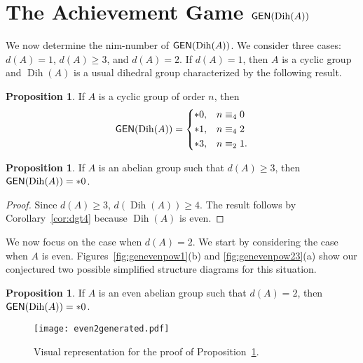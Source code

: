 \documentclass[12pt]{amsart}
\theoremstyle{definition}
\newtheorem{proposition}[equation]{Proposition}
\theoremstyle{definition}
\numberwithin{equation}{section}
\begin{document}
\section{The Achievement Game ${\text{\sf GEN}}({\operatorname{Dih}}(A))$}

We now determine the nim-number of ${\text{\sf GEN}}({\operatorname{Dih}}(A))$. We consider three cases: $d(A)=1$, $d(A)\geq 3$, and $d(A)=2$.  If $d(A)=1$, then $A$ is a cyclic group and ${\operatorname{Dih}}(A)$ is a usual dihedral group characterized by the following result.

\begin{proposition}\cite[Corollary~7.10]{ErnstSieben}\label{prop:DihedralResults}
If $A$ is a cyclic group of order $n$, then 
\[
{\text{\sf GEN}}({\operatorname{Dih}}(A))=
\begin{dcases}
*0,          & n \equiv_4 0 \\
*1,          & n \equiv_4 2 \\
*3,          & n \equiv_2 1. \\
\end{dcases}
\]
\end{proposition}

\begin{proposition}\label{prop:ManyGenerated}
If $A$ is an abelian group such that ${d}(A) \geq 3$, then ${\text{\sf GEN}}({\operatorname{Dih}}(A))=*0$.
\end{proposition}

\begin{proof}
Since ${d}(A) \geq 3$, ${d}({\operatorname{Dih}}(A)) \geq 4$. The result follows by Corollary~\ref{cor:dgt4} because ${\operatorname{Dih}}(A)$ is even.
\end{proof}

We now focus on the case when ${d}(A)=2$.  We start by considering the case when $A$ is even.
Figures~\ref{fig:genevenpow1}(b) and \ref{fig:genevenpow23}(a) show our conjectured two possible simplified structure diagrams for this situation.

\begin{proposition} \label{prop:Even2Generated}
If $A$ is an even abelian group such that ${d}(A)=2$, then ${\text{\sf GEN}}({\operatorname{Dih}}(A))=*0$.
\end{proposition}

\begin{figure}
\texttt{[image: even2generated.pdf]}
\caption{\label{fig:Even2Generated}Visual representation for the proof of Proposition~\ref{prop:Even2Generated}.}
\end{figure}
\end{document}
